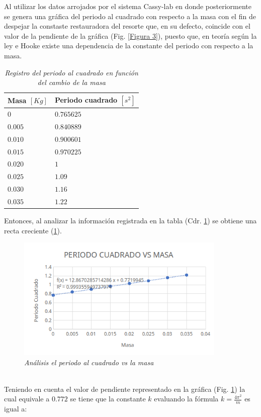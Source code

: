 \documentclass[spanish,notitlepage,letterpaper, 12pt]{article}
\begin{document}
Al utilizar los datos arrojados por el sistema Cassy-lab en donde posteriormente se genera una gráfica del periodo al cuadrado con respecto a la masa con el fin de despejar la constaste restauradora del resorte que, en su defecto, coincide con el valor de la pendiente de la gráfica (Fig. \ref{Figura
3}), puesto que, en teoría según la ley e Hooke existe una dependencia de la constante del periodo con respecto a la masa.
\newpage
\begin{table}[h]
    \centering
    \begin{tabular}{l|l}
        Masa $[Kg]$ & Periodo cuadrado $[s^2]$ \\
        \hline \hline
        $0$ & $0.765625$ \\
        $0.005$ & $0.840889$ \\
        $0.010$ & $0.900601$ \\
        $0.015$ & $0.970225$ \\
        $0.020$ & $1$ \\
        $0.025$ & $1.09$ \\
        $0.030$ & $1.16$ \\
        $0.035$ & $1.22$ \\
    \end{tabular}
    \caption{\textit{Registro del periodo al cuadrado en función del cambio de la masa}}
    \label{Table 2}
\end{table}
Entonces, al analizar la información registrada en la tabla (Cdr. \ref{Table 2}) se obtiene una recta creciente (\ref{Figura 3}).
\begin{figure}[h]
    \centering
    \includegraphics[width=10.0cm]{images/periodo-cuadrado-vs-masa.png}
    \caption{\textit{Análisis el periodo al cuadrado vs la masa}}
    \label{Figura 3}
\end{figure}
\\
Teniendo en cuenta el valor de pendiente representado en la gráfica (Fig. \ref{Figura 3}) la cual equivale a $0.772$ se tiene que la constante $k$ evaluando la fórmula $k=\frac{4\pi^2}{m}$ es igual a:
\end{document}
